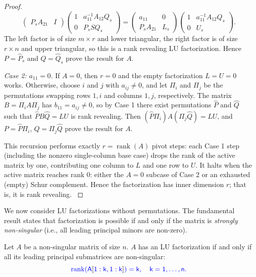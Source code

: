 \documentclass[10pt,twoside]{siamart1116}
\DeclareMathOperator{\rk}{rank}
\newcommand{\by}{\times}
\numberwithin{theorem}{section}
\providecommand{\DIFadd}[1]{{\protect\color{blue} \sf #1}} %
\begin{document}
\begin{proof}
\[{\begin{pmatrix}
      P_s A_{21} & I
    \end{pmatrix}
    \begin{pmatrix}
      1 & a_{11}^{-1} A_{12} Q_s \\
      0 & P_s S Q_s
    \end{pmatrix}
    =
    \begin{pmatrix}
      a_{11}     & 0   \\
      P_s A_{21} & L_s
    \end{pmatrix}
    \begin{pmatrix}
      1 & a_{11}^{-1} A_{12} Q_s \\
      0 & U_s
    \end{pmatrix}.
  }\]
  \DIFadd{The left factor is of size $m \by r$ and lower triangular, the right factor is of size $r \by n$ and upper triangular, so this is a rank revealing LU factorization. Hence $P = \widehat{P}_s$ and $Q = \widehat{Q}_s$ prove the result for $A$.
}

  \DIFadd{\emph{Case 2: $a_{11} = 0$.} If $A = 0$, then $r = 0$ and the empty factorization $L = U = 0$ works. Otherwise, choose $i$ and $j$ with $a_{ij} \neq 0$, and let $\Pi_i$ and $\Pi_j$ be the permutations swapping rows $1, i$ and columns $1, j$, respectively. The matrix $B = \Pi_i A \Pi_j$ has $b_{11} = a_{ij} \neq 0$, so by Case 1 there exist permutations $\widehat{P}$ and $\widehat{Q}$ such that $\widehat{P} B \widehat{Q} = LU$ is rank revealing. Then $(\widehat{P} \Pi_i) A (\Pi_j \widehat{Q}) = LU$, and $P = \widehat{P} \Pi_i$, $Q = \Pi_j \widehat{Q}$ prove the result for $A$.
}

  \DIFadd{This recursion performs exactly $r=\rk(A)$ pivot steps: each Case 1 step (including the nonzero single-column base case) drops the rank of the active matrix by one, contributing one column to $L$ and one row to $U$. It halts when the active matrix reaches rank $0$: either the $A=0$ subcase of Case 2 or an exhausted (empty) Schur complement. Hence the factorization has inner dimension $r$; that is, it is rank revealing.
}\end{proof}

\DIFadd{We now consider LU factorizations without permutations. The fundamental result states that factorization is possible if and only if the matrix is \emph{strongly non-singular} (i.e., all leading principal minors are non-zero).
}

\begin{proposition}\label{prop:sufficient}
  \DIFadd{Let $A$ be a non-singular matrix of size $n$. $A$ has an LU factorization if and only if all its leading principal submatrices are non-singular:
  }\[
    \DIFadd{\rk(A}[\DIFadd{1:k,1:k}]\DIFadd{) = k, \quad k = 1, \ldots, n.
  }\]
\end{proposition}
\end{document}
